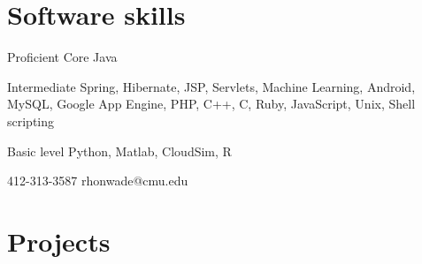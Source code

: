 \documentclass{tccv}
\begin{document}
\vspace{-0.2in}
\section{Software skills}
\begin{factlist}
\item{Proficient}
     {Core Java}       

\item{Intermediate}
     {Spring, Hibernate, JSP, Servlets, Machine Learning, Android, MySQL, Google App Engine, PHP, C++, C, Ruby, JavaScript, Unix, Shell scripting}

\item{Basic level}
     {Python, Matlab, CloudSim, R}
\end{factlist}

    {412-313-3587}
    {rhonwade@cmu.edu}

\section{Projects}
\end{document}

